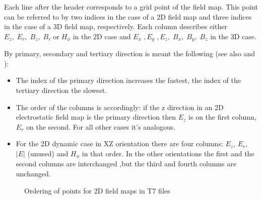 Each line after the header corresponds to a grid point of the field map. This point can be referred to by two indices in
the case of a 2D field map and three indices in the case of a 3D field map, respectively. Each column describes either
$E_z,\; E_r,\; B_z,\; B_r\; \text{or}\;H_{\phi}$ in the 2D case and $E_x\;, E_y\;, E_z,\; B_x,\; B_y,\;B_z$ in the 3D case.

By primary, secondary and tertiary direction is meant the following (see also  and ):
\begin{itemize}
\item
The index of the primary direction increases the fastest, the index of the tertiary direction the slowest.
\item
The order of the columns is accordingly: if the z direction in an 2D electrostatic field map is the primary direction then $E_z$ is
on the first column, $E_r$ on the second. For all other cases it's analogous.
\item
For the 2D dynamic case in XZ orientation there are four columns: $E_z$, $E_r$, $|E|$ (unused) and $H_{\phi}$ in that order.
In the other orientations the first and the second columns are interchanged ,but the third and fourth columns are unchanged.
\end{itemize}

\begin{figure}[tb]
\centering
{}
\hspace{0.05\textwidth}
\caption[]{Ordering of points for 2D field maps in  T7 files}
\label{fig:fieldmap_ordering}
\end{figure}

